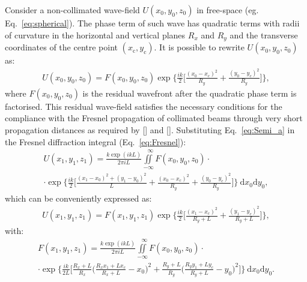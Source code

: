 \begin{refsection}
Consider a non-collimated wave-field $U(x_0,y_0,z_0)$ in free-space (eg. Eq.~\ref{eq:spherical}). The phase term of such wave has quadratic terms with radii of curvature in the horizontal and vertical planes $R_x$ and $R_y$ and the transverse coordinates of the centre point $(x_\text{c},y_\text{c})$. It is possible to rewrite $U(x_0,y_0,z_0)$ as:
\begin{align}\label{eq:Semi_a}
    U(x_0,y_0,z_0) = F(x_0,y_0,z_0)\exp{\Bigg\{\frac{ik}{2}\Bigg[\frac{(x_0-x_c)^2}{R_y}+\frac{(y_0-y_c)^2}{R_y} \Bigg]\Bigg\}},
\end{align}{}
where $F(x_0,y_0,z_0)$ is the residual wavefront after the quadratic phase term is factorised. This residual wave-field satisfies the necessary conditions for the compliance with the Fresnel propagation of collimated beams through very short propagation distances as required by [\cite{Southwell1981}] and [\cite{Rees87}]. Substituting Eq.~\ref{eq:Semi_a} in the Fresnel diffraction integral (Eq.~\ref{eq:Fresnel}):
\begin{multline}\label{eq:Semi_b}
    U(x_1,y_1,z_1)=\frac{k\exp{(ikL)}}{2\pi i L}\iint\limits_{-\infty}^{\hspace{8pt}\infty}{F(x_0,y_0,z_0)}\cdot\\ \cdot{\exp{\Bigg\{\frac{ik}{2}\Bigg[\frac{(x_1-x_0)^2+(y_1-y_0)^2}{L}+\frac{(x_0-x_c)^2}{R_y}+\frac{(y_0-y_c)^2}{R_y} \Bigg]\Bigg\}}~\mathrm{d}x_0\mathrm{d}y_0},
\end{multline}
which can be conveniently expressed as: 
\begin{align}\label{eq:Semi_c1}
    U(x_1,y_1,z_1) = F(x_1,y_1,z_1)\exp{\Bigg\{\frac{ik}{2}\Bigg[\frac{(x_1-x_c)^2}{R_y+L}+\frac{(y_1-y_c)^2}{R_y+L} \Bigg]\Bigg\}},
\end{align}{}
with:
\begin{multline}\label{eq:Semi_c2}
    F(x_1,y_1,z_1)=\frac{k\exp{(ikL)}}{2\pi i L}\iint\limits_{-\infty}^{\hspace{8pt}\infty}{F(x_0,y_0,z_0)}\cdot\\ \cdot{\exp{\Bigg\{\frac{ik}{2L}\Bigg[\frac{R_x + L}{R_x}\Bigg(\frac{R_xx_1+Lx_c}{R_x+L} - x_0\Bigg)^2+\frac{R_y + L}{R_y}\Bigg(\frac{R_yy_1+Ly_c}{R_y+L} - y_0\Bigg)^2\Bigg]\Bigg\}}~\mathrm{d}x_0\mathrm{d}y_0}.
\end{multline}

\end{refsection}
